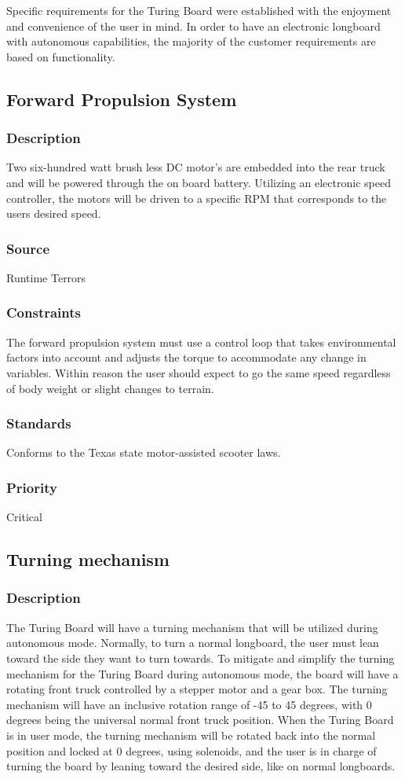 Specific requirements for the Turing Board were established with the enjoyment and convenience of the user in mind. In order to have an electronic longboard with autonomous capabilities, the majority of the customer requirements are based on functionality.

\subsection{Forward Propulsion System}
\subsubsection{Description}
Two six-hundred watt brush less DC motor's are embedded into the rear truck and will be powered through the on board battery. Utilizing an electronic speed controller, the motors will be driven to a specific RPM that corresponds to the users desired speed.
\subsubsection{Source}
Runtime Terrors
\subsubsection{Constraints}
The forward propulsion system must use a control loop that takes environmental factors into account and adjusts the torque to accommodate any change in variables. Within reason the user should expect to go the same speed regardless of body weight or slight changes to terrain.
\subsubsection{Standards}
Conforms to the Texas state motor-assisted scooter laws.
\subsubsection{Priority}
Critical

\subsection{Turning mechanism}
\subsubsection{Description}
The Turing Board will have a turning mechanism that will be utilized during autonomous mode. Normally, to turn a normal longboard, the user must lean toward the side they want to turn towards. To mitigate and simplify the turning mechanism for the Turing Board during autonomous mode, the board will have a rotating front truck controlled by a stepper motor and a gear box. The turning mechanism will have an inclusive rotation range of -45 to 45 degrees, with 0 degrees being the universal normal front truck position. When the Turing Board is in user mode, the turning mechanism will be rotated back into the normal position and locked at 0 degrees, using solenoids, and the user is in charge of turning the board by leaning toward the desired side, like on normal longboards.
